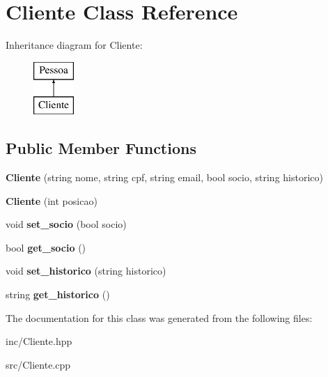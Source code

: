 \hypertarget{class_cliente}{}\section{Cliente Class Reference}
\label{class_cliente}
Inheritance diagram for Cliente\+:\begin{figure}[H]
\begin{center}
\leavevmode
\includegraphics[height=2.000000cm]{class_cliente}
\end{center}
\end{figure}
\subsection*{Public Member Functions}
\begin{DoxyCompactItemize}
\item 
{\bfseries Cliente} (string nome, string cpf, string email, bool socio, string historico)\hypertarget{class_cliente_ae3de50bfea773d769f2741502f3363fd}{}\label{class_cliente_ae3de50bfea773d769f2741502f3363fd}

\item 
{\bfseries Cliente} (int posicao)\hypertarget{class_cliente_ab978791569ca028b959190b5926567bd}{}\label{class_cliente_ab978791569ca028b959190b5926567bd}

\item 
void {\bfseries set\+\_\+socio} (bool socio)\hypertarget{class_cliente_a13f1249779395a989ef94541ce73435b}{}\label{class_cliente_a13f1249779395a989ef94541ce73435b}

\item 
bool {\bfseries get\+\_\+socio} ()\hypertarget{class_cliente_ac19d3bc1957721f87c5605d33d75c020}{}\label{class_cliente_ac19d3bc1957721f87c5605d33d75c020}

\item 
void {\bfseries set\+\_\+historico} (string historico)\hypertarget{class_cliente_ad5192d8b45eced8b09202392c3267c07}{}\label{class_cliente_ad5192d8b45eced8b09202392c3267c07}

\item 
string {\bfseries get\+\_\+historico} ()\hypertarget{class_cliente_a5b6943726dfc79b19d05a9a8b781683e}{}\label{class_cliente_a5b6943726dfc79b19d05a9a8b781683e}

\end{DoxyCompactItemize}


The documentation for this class was generated from the following files\+:\begin{DoxyCompactItemize}
\item 
inc/Cliente.\+hpp\item 
src/Cliente.\+cpp\end{DoxyCompactItemize}
